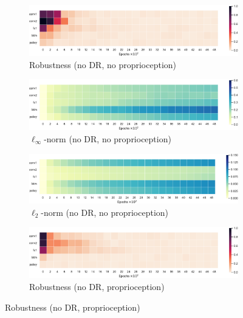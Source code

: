 \begin{figure}
  \centering
  \begin{subfigure}{0.32\textwidth}
    \includegraphics[width=\textwidth]{figures/chapter6/robustness/jaco/visual_std/error}
    \caption{Robustness (no DR, no proprioception)}
  \end{subfigure}
  \begin{subfigure}{0.32\textwidth}
    \includegraphics[width=\textwidth]{figures/chapter6/robustness/jaco/visual_std/inf_dist}
    \caption{$\ell_\infty$-norm (no DR, no proprioception)}
  \end{subfigure}
  \begin{subfigure}{0.32\textwidth}
    \includegraphics[width=\textwidth]{figures/chapter6/robustness/jaco/visual_std/l2_dist}
    \caption{$\ell_2$-norm (no DR, no proprioception)}
  \end{subfigure}
  \begin{subfigure}{0.32\textwidth}
    \includegraphics[width=\textwidth]{figures/chapter6/robustness/jaco/sensor_std/error}
    \caption{Robustness (no DR, proprioception)}
  \end{subfigure}

\end{figure}
